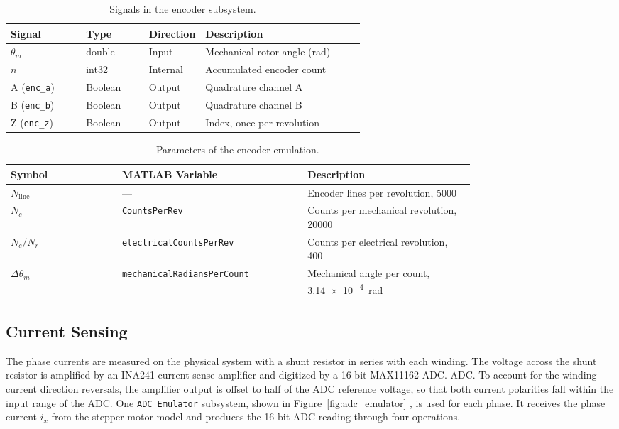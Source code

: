 \begin{table}[htbp]
	\centering
	\caption{Signals in the encoder subsystem.}
	\vspace{4pt}
	\label{tab:enc_signals}
	\begin{tabular}{ll>{\raggedright\arraybackslash}p{0.13\linewidth}>{\raggedright\arraybackslash}p{0.45\linewidth}}
		\hline
		Signal & Type & Direction & Description \\
		\hline
		$\theta_m$ & double  & Input  & Mechanical rotor angle (\si{\radian}) \\
		$n$        & int32   & Internal & Accumulated encoder count \\
		A (\texttt{enc\_a}) & Boolean & Output & Quadrature channel A \\
		B (\texttt{enc\_b}) & Boolean & Output & Quadrature channel B \\
		Z (\texttt{enc\_z}) & Boolean & Output & Index, once per revolution \\
		\hline
	\end{tabular}
\end{table}

\begin{table}[htbp]
	\centering
	\caption{Parameters of the encoder emulation.}
	\vspace{4pt}
	\label{tab:enc_params}
	\begin{tabular}{l>{\raggedright\arraybackslash}p{0.4\linewidth}>{\raggedright\arraybackslash}p{0.36\linewidth}}
		\hline
		Symbol & MATLAB Variable & Description \\
		\hline
		$N_{\mathrm{line}}$ & --- & Encoder lines per revolution, 5000 \\
		$N_c$ & \texttt{CountsPerRev} & Counts per mechanical revolution, 20000 \\
		$N_c / N_r$ & \texttt{electricalCountsPerRev} & Counts per electrical revolution, 400 \\
		$\Delta\theta_m$ & \texttt{mechanicalRadiansPerCount} & Mechanical angle per count, \SI{3.14e-4}{\radian} \\
		\hline
	\end{tabular}
\end{table}

\subsection{Current Sensing}\label{sec:currentSensing}


The phase currents are measured on the physical system with a shunt resistor in series with each winding. The voltage across the shunt resistor is amplified by an INA241 current-sense amplifier and digitized by a 16-bit MAX11162 ADC. ADC\cite{ti_ina241_2023,adi_max11162_2017}. To account for the winding current direction reversals, the amplifier output is offset to half of the ADC reference voltage, so that both current polarities fall within the input range of the ADC. One \texttt{ADC Emulator} subsystem, shown in Figure~\ref{fig:adc_emulator} %
, is used for each phase. It receives the phase current $i_x$ from the stepper motor model and produces the 16-bit ADC reading through four operations.

